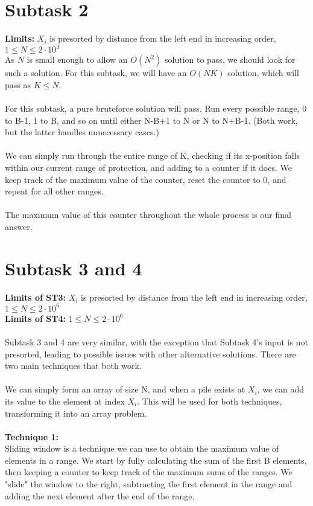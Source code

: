 \documentclass{report}
\begin{document}
\section*{Subtask 2}
\textbf{Limits: } $X_i$ is presorted by distance from the left end in increasing order, $1 \leq N \leq 2 \cdot 10^{3}$\\
As $N$ is small enough to allow an $O(N^2)$ solution to pass, we should look for such a solution. For this subtask, we will have an $O(NK)$ solution, which will pass as $K \leq N$.\\\\
For this subtask, a pure bruteforce solution will pass. Run every possible range, 0 to B-1, 1 to B, and so on until either N-B+1 to N or N to N+B-1. (Both work, but the latter handles unnecessary cases.)\\\\
We can simply run through the entire range of K, checking if its x-position falls within our current range of protection, and adding to a counter if it does. We keep track of the maximum value of the counter, reset the counter to 0, and repeat for all other ranges.\\\\
The maximum value of this counter throughout the whole process is our final answer.

\section*{Subtask 3 and 4}
\textbf{Limits of ST3: } $X_i$ is presorted by distance from the left end in increasing order, $1 \leq N \leq 2 \cdot 10^{6}$\\
\textbf{Limits of ST4: } $1 \leq N \leq 2 \cdot 10^{6}$\\\\

Subtask 3 and 4 are very similar, with the exception that Subtask 4's input is not presorted, leading to possible issues with other alternative solutions. There are two main techniques that both work.\\\\

We can simply form an array of size N, and when a pile exists at $X_i$, we can add its value to the element at index $X_i$. This will be used for both techniques, transforming it into an array problem.\\\\

\textbf{Technique 1:}\\
Sliding window is a technique we can use to obtain the maximum value of elements in a range. We start by fully calculating the sum of the first B elements, then keeping a counter to keep track of the maximum sums of the ranges. We "slide" the window to the right, subtracting the first element in the range and adding the next element after the end of the range. \\\\
\end{document}
